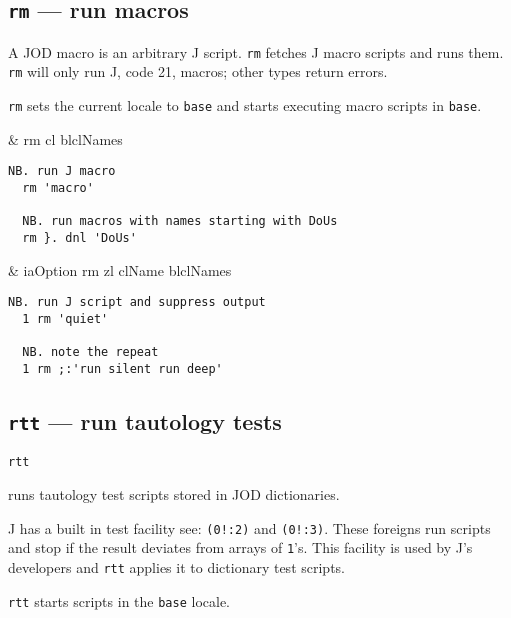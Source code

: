 \subsection{\texttt{rm} --- run macros}\label{ss:rm}
 
A JOD macro is an arbitrary J script.  \hypertarget{il:rm}{\texttt{rm}} 
fetches J macro scripts and runs them. \texttt{rm} will only run J, code 21, macros; other types return errors.  

\texttt{rm} sets the current locale to \texttt{base} and starts 
executing macro scripts in \texttt{base}. 

\begin{wordhead}
\monad & rm cl \argsep blclNames \\
\end{wordhead}
\begin{lstlisting}[frame=single,framerule=0pt] 
  NB. run J macro 
  rm 'macro' 

  NB. run macros with names starting with DoUs
  rm }. dnl 'DoUs' 
\end{lstlisting}   

\begin{wordhead}
\dyad & iaOption rm zl \argsep clName \argsep blclNames \\
\end{wordhead}
\begin{lstlisting}[frame=single,framerule=0pt] 
  NB. run J script and suppress output 
  1 rm 'quiet' 

  NB. note the repeat 
  1 rm ;:'run silent run deep' 
\end{lstlisting}                  


\subsection{\texttt{rtt} --- run tautology tests}\label{ss:rtt}

\hypertarget{il:rtt}{\texttt{rtt}} runs tautology 
test scripts stored in JOD dictionaries. 

J has a built in test facility see: \verb|(0!:2)| and \verb|(0!:3)|.  
These foreigns run scripts and stop if the result deviates 
from arrays of \texttt{1}'s.  This facility is used by J's developers 
and \texttt{rtt} applies it to dictionary test scripts.  
  
\texttt{rtt} starts scripts in the \texttt{base} locale. 

